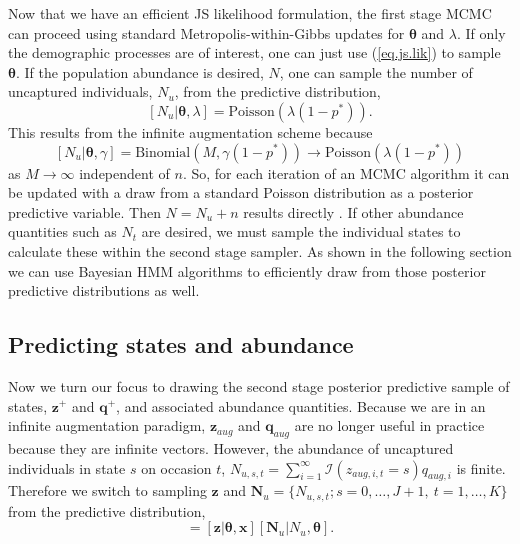 \documentclass[11pt]{article}
\newcommand{\bx}{\ensuremath{\mathbf{x}}}
\newcommand{\bz}{\ensuremath{\mathbf{z}}}
\newcommand{\bN}{\ensuremath{\mathbf{N}}}
\newcommand{\bt}{\ensuremath{\boldsymbol{\theta}}}
\newcommand{\bq}{\ensuremath{\mathbf{q}}}
\begin{document}
Now that we have an efficient JS likelihood formulation, the first stage MCMC can proceed using standard Metropolis-within-Gibbs updates for $\bt$ and $\lambda$. If only the demographic processes are of interest, one can just use (\ref{eq.js.lik}) to sample $\bt$. If the population abundance is desired, $N$, one can sample the number of uncaptured individuals, $N_u$, from the predictive distribution,
\[
[N_u|\bt, \lambda] = \text{Poisson}(\lambda (1-p^*)).
\] 
This results from the infinite augmentation scheme because 
\[
[N_u|\bt,\gamma] = \text{Binomial}(M, \gamma(1-p^*)) \to \text{Poisson}(\lambda(1-p^*))
\]
as $M\to\infty$ independent of $n$. So, for each iteration of an MCMC algorithm it can be updated with a draw from a standard Poisson distribution as a posterior predictive variable. Then $N = N_u + n$ results directly \citep{johnson2010model, schofield2023estimating}. If other abundance quantities such as $N_t$ are desired, we must sample the individual states to calculate these within the second stage sampler. As shown in the following section we can use Bayesian HMM algorithms to efficiently draw from those posterior predictive distributions as well. 


\subsection{Predicting states and abundance}

Now we turn our focus to drawing the second stage posterior predictive sample of states, $\bz^+$ and $\bq^+$, and associated abundance quantities. Because we are in an infinite augmentation paradigm, $\bz_{aug}$ and $\bq_{aug}$ are no longer useful in practice because they are infinite vectors. However, the abundance of uncaptured individuals in state $s$ on occasion $t$, $N_{u,s,t} = \sum_{i=1}^\infty \mathcal{I}(z_{aug,i,t}=s)q_{aug,i}$ is finite. Therefore we switch to sampling $\bz$ and $\bN_u = \{N_{u,s,t}; s=0,\dots,J+1,\ t=1,\dots,K\}$  from the predictive distribution,
\begin{equation}
[\bz, \bN_u|N_u, \bt,\bx] = [\bz|\bt,\bx][\bN_u|N_u,\bt].
\end{equation} 
\end{document}
